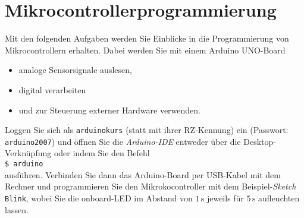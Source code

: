 \documentclass[12pt]{article}
\begin{document}





\part*{Mikrocontrollerprogrammierung}


Mit den folgenden Aufgaben werden Sie Einblicke in die Programmierung von Mikrocontrollern erhalten. Dabei werden Sie mit einem Arduino UNO-Board
\vspace*{-5pt}
\begin{itemize}
    \setlength\itemsep{-5pt}
    \item analoge Sensorsignale auslesen,
    \item digital verarbeiten
    \item und zur Steuerung externer Hardware verwenden.
\end{itemize}
\vspace*{1.0cm}







Loggen Sie sich als \texttt{arduinokurs} (statt mit ihrer RZ-Kennung) ein (Passwort: \texttt{arduino2007}) und öffnen Sie die \textit{Arduino-IDE} entweder über die Desktop-Verknüpfung oder indem Sie den Befehl\\

\hspace{1.0cm}\texttt{\$ arduino}\\

ausführen. Verbinden Sie dann das Arduino-Board per USB-Kabel mit dem Rechner und programmieren Sie den Mikrokocontroller mit dem Beispiel-\textit{Sketch} \texttt{Blink},
wobei Sie die onboard-LED im Abstand von $1\,\mathrm{s}$ jeweils für $5\,\mathrm{s}$ aufleuchten lassen.




\end{document}
